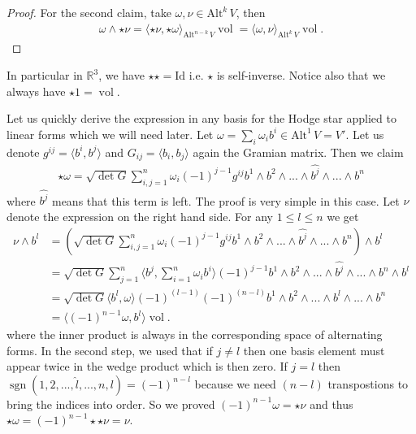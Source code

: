 \documentclass[12pt,a4paper]{article}
\numberwithin{equation}{subsection}
\numberwithin{lemma}{subsection}
\theoremstyle{definition}
\DeclareMathOperator{\sgn}{sgn}
\DeclareMathOperator{\vol}{vol}
\newcommand{\alternating}[2]{ {\text{Alt}^{#1}\,#2} }
\newcommand{\real}{\mathbb{R}}
\begin{document}
\begin{proof}
    For the second claim, take $\omega, \nu \in \alternating{k}{V}$, then
    \begin{align*}
        \omega \wedge \star \nu = \langle \star \nu , \star \omega \rangle _{\alternating{n-k}{V}} \vol
        = \langle \omega , \nu \rangle _{\alternating{k}{V}} \vol.
    \end{align*}
\end{proof}
In particular in $\real^3$, we have 
$\star\star = \text{Id}$ i.e. $\star$ is self-inverse. Notice also 
that we always have $\star 1 = \vol$.

Let us quickly derive the expression in any basis 
for the Hodge star applied to linear 
forms which we will need later. Let $\omega = \sum_i \omega_i b^i \in 
\alternating{1}{V} = V'$. Let us denote $g^{ij} = \langle b^i, b^j \rangle$ 
and $G_{ij} = \langle b_i, b_j \rangle$ again the Gramian matrix.
Then we claim
\begin{align}
    \star \omega = \sqrt{\det G} \sum_{i,j=1}^n \omega_i (-1)^{j-1} 
        g^{ij} b^1 \wedge
        b^2 \wedge ... \wedge \widehat{b^j}\wedge ... \wedge b^n 
        \label{eq:hodge_star_one_forms}
\end{align}
where $\widehat{b^j}$ means that this term is left. The proof is very 
simple in this case. Let $\nu$ denote the expression on the right hand side.
For any $1 \leq l \leq n$ we get
\begin{align*}
    \nu \wedge b^l &= \left( \sqrt{\det G} \sum_{i,j=1}^n \omega_i (-1)^{j-1} g^{ij} b^1 \wedge
        b^2 \wedge ... \wedge \widehat{b^j} \wedge ... \wedge b^n\right) \wedge b^l 
    \\ &= \sqrt{\det G} \sum_{j=1}^n \langle b^j,\sum_{i=1}^n \omega_i  b^i\rangle
        (-1)^{j-1}  b^1 \wedge
        b^2 \wedge ... \wedge \widehat{b^j} \wedge ... \wedge b^n \wedge b^l
    \\ &= \sqrt{\det G} \langle b^l,\omega \rangle
        (-1)^{(l-1)}(-1)^{(n-l)}  b^1 \wedge
        b^2 \wedge ... \wedge b^l  \wedge ... \wedge b^n 
    \\ &= \langle (-1)^{n-1}\omega, b^l \rangle \vol.
\end{align*}
where the inner product is always in the corresponding space of alternating forms.
In the second step, we used that if $j\neq l$ then one basis element must 
appear twice in the wedge product which is then zero. If $j=l$ then 
$\sgn (1,2, ..., \hat{l},...,n,l) = (-1)^{n-l}$ because we need $(n-l)$
transpostions to bring the indices into order. So we proved 
$(-1)^{n-1}\omega = \star \nu$ and thus $\star \omega = (-1)^{n-1} \star\star\nu = \nu$.
\end{document}
